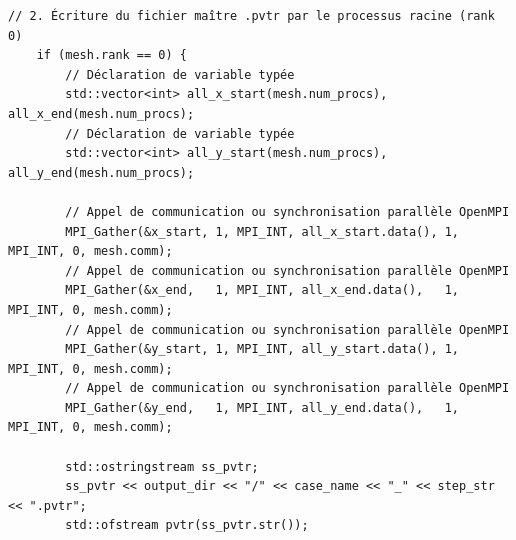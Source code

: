 \documentclass[10pt,a4paper,oneside]{book}
\begin{document}
\begin{lstlisting}[language={[11]C++}]
    // 2. Écriture du fichier maître .pvtr par le processus racine (rank 0)
    if (mesh.rank == 0) {
        // Déclaration de variable typée
        std::vector<int> all_x_start(mesh.num_procs), all_x_end(mesh.num_procs);
        // Déclaration de variable typée
        std::vector<int> all_y_start(mesh.num_procs), all_y_end(mesh.num_procs);

        // Appel de communication ou synchronisation parallèle OpenMPI
        MPI_Gather(&x_start, 1, MPI_INT, all_x_start.data(), 1, MPI_INT, 0, mesh.comm);
        // Appel de communication ou synchronisation parallèle OpenMPI
        MPI_Gather(&x_end,   1, MPI_INT, all_x_end.data(),   1, MPI_INT, 0, mesh.comm);
        // Appel de communication ou synchronisation parallèle OpenMPI
        MPI_Gather(&y_start, 1, MPI_INT, all_y_start.data(), 1, MPI_INT, 0, mesh.comm);
        // Appel de communication ou synchronisation parallèle OpenMPI
        MPI_Gather(&y_end,   1, MPI_INT, all_y_end.data(),   1, MPI_INT, 0, mesh.comm);

        std::ostringstream ss_pvtr;
        ss_pvtr << output_dir << "/" << case_name << "_" << step_str << ".pvtr";
        std::ofstream pvtr(ss_pvtr.str());


\end{lstlisting}
\end{document}
